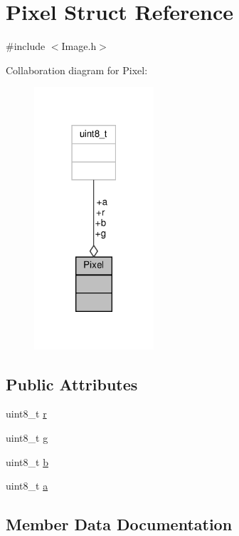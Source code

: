 \hypertarget{structPixel}{}\section{Pixel Struct Reference}
\label{structPixel}


{\ttfamily \#include $<$Image.\+h$>$}



Collaboration diagram for Pixel\+:
\nopagebreak
\begin{figure}[H]
\begin{center}
\leavevmode
\includegraphics[width=126pt]{structPixel__coll__graph}
\end{center}
\end{figure}
\subsection*{Public Attributes}
\begin{DoxyCompactItemize}
\item 
uint8\+\_\+t \hyperlink{structPixel_a47d65d4a410f57c46746ddedd709e177}{r}
\item 
uint8\+\_\+t \hyperlink{structPixel_aeab078b7768caf273f8fe1daffa50729}{g}
\item 
uint8\+\_\+t \hyperlink{structPixel_abc9f592730eddbfcb270a1974a498d78}{b}
\item 
uint8\+\_\+t \hyperlink{structPixel_ad5c63be985fc9e1d1089907a89d7671c}{a}
\end{DoxyCompactItemize}


\subsection{Member Data Documentation}
\mbox{\label{structPixel_ad5c63be985fc9e1d1089907a89d7671c}} 
